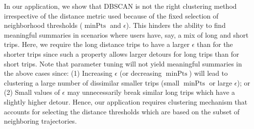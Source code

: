 In our application, we show that DBSCAN is not the right clustering method irrespective of the distance metric used because of the fixed selection of neighborhood thresholds ($\operatorname{minPts}$ and $\epsilon$). This hinders the ability to find meaningful summaries in scenarios where users have, say, a mix of long and short trips. Here, we require the long distance trips to have a larger $\epsilon$ than for the shorter trips since such a property allows larger detours for long trips than for short trips. Note that parameter tuning will not yield meaningful summaries in the above cases since: (1) Increasing $\epsilon$ (or decreasing $\operatorname{minPts}$) will lead to clustering a large number of dissimilar smaller trips (small $\operatorname{minPts}$ or large $\epsilon$); or (2) Small values of $\epsilon$ may unnecessarily break similar long trips which have a slightly higher detour. Hence, our application requires clustering mechanism that accounts for selecting the distance thresholds which are based on the subset of neighboring trajectories. 

